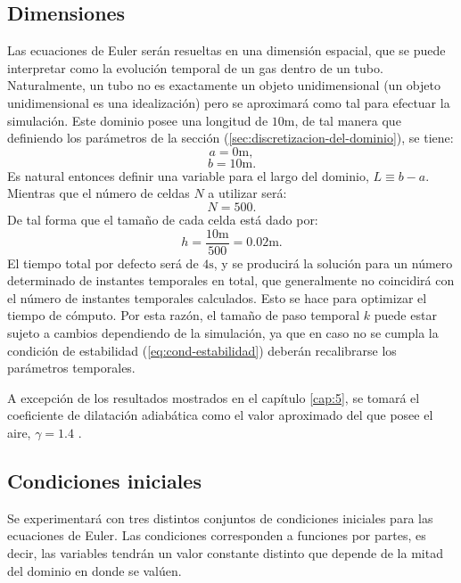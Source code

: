 \subsection{Dimensiones}
\label{sec:dimensiones}
Las ecuaciones de Euler serán resueltas en una dimensión espacial, que se puede interpretar como la evolución temporal de un gas dentro de un tubo. Naturalmente, un tubo no es exactamente un objeto unidimensional (un objeto unidimensional es una idealización) pero se aproximará como tal para efectuar la simulación. Este dominio posee una longitud de $10\unit{\meter}$, de tal manera que definiendo los parámetros de la sección (\ref{sec:discretizacion-del-dominio}), se tiene:
\begin{equation}
	a = 0 \unit{\meter},
\end{equation}
\begin{equation}
	b = 10 \unit{\meter}.
\end{equation}
Es natural entonces definir una variable para el largo del dominio, $L\equiv b-a$. Mientras que el número de celdas $N$ a utilizar será:
\begin{equation}
	N = 500.
\end{equation}
De tal forma que el tamaño de cada celda está dado por:
\begin{equation}
	h = \frac{10\unit{\meter}}{500} = 0.02 \unit{\meter}.
\end{equation}
El tiempo total por defecto será de $4\unit{\second}$, y se producirá la solución para un número determinado de instantes temporales en total, que generalmente no coincidirá con el número de instantes temporales calculados. Esto se hace para optimizar el tiempo de cómputo. Por esta razón, el tamaño de paso temporal $k$ puede estar sujeto a cambios dependiendo de la simulación, ya que en caso no se cumpla la condición de estabilidad (\ref{eq:cond-estabilidad}) deberán recalibrarse los parámetros temporales.

A excepción de los resultados mostrados en el capítulo \ref{cap:5}, se tomará el coeficiente de dilatación adiabática como el valor aproximado del que posee el aire, $\gamma = 1.4$ \cite{LeVeque}.

\subsection{Condiciones iniciales}
Se experimentará con tres distintos conjuntos de condiciones iniciales para las ecuaciones de Euler. Las condiciones corresponden a funciones por partes, es decir, las variables tendrán un valor constante distinto que depende de la mitad del dominio en donde se valúen.


